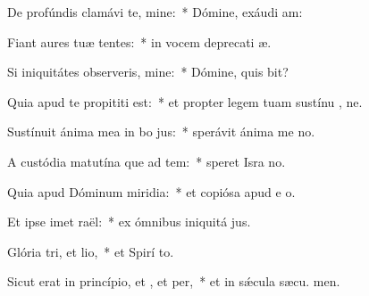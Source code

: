 \item De profúndis clamávi  te, mine:~* Dómine, exáudi  am:
\item Fiant aures tuæ tentes:~* in vocem deprecati æ.
\item Si iniquitátes observeris, mine:~* Dómine, quis bit?
\item Quia apud te propititi est:~* et propter legem tuam sustínu , ne.
\item Sustínuit ánima mea in bo jus:~* sperávit ánima me  no.
\item A custódia matutína que ad tem:~* speret Isra  no.
\item Quia apud Dóminum miridia:~* et copiósa apud e o.
\item Et ipse imet raël:~* ex ómnibus iniquitá jus.
\item Glória tri, et lio,~* et Spirí to.
\item Sicut erat in princípio, et , et per,~* et in sǽcula sæcu. men.

